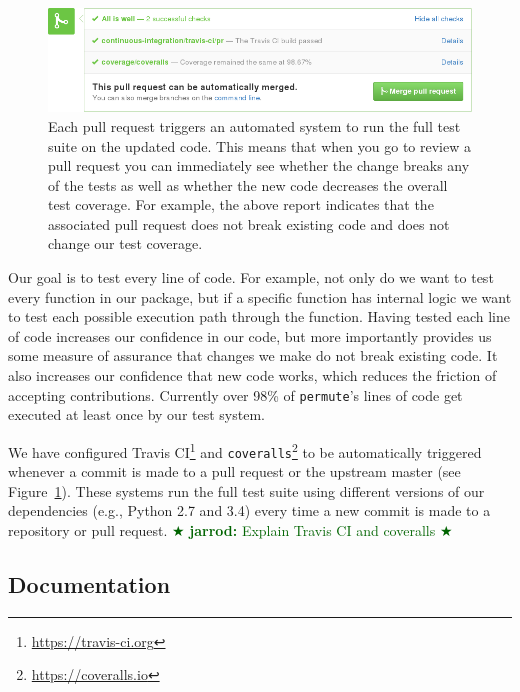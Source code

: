 \documentclass[]{article}
\newcommand{\jarrod}[1] { \textcolor{darkgreen} {
\ensuremath{\bigstar} {\bf jarrod:}  {#1}
\ensuremath{\bigstar} } }
\begin{document}
\begin{figure}
  \begin{centering}
    \includegraphics[width=\textwidth]{_fig/pull-request-ci.png}\par
  \end{centering}

  \caption{\label{fig:pull-request}
  \small
    Each pull request triggers an automated system to run the full test suite on
    the updated code.
    This means that when you go to review a pull request you can immediately see
    whether the change breaks any of the tests as well as whether the new
    code decreases the overall test coverage.
    For example, the above report indicates that the associated pull request does not
    break existing code and does not change our test coverage.}
\end{figure}

Our goal is to test every line of code.
For example, not only do we want to test every function in our package, but if
a specific function has internal logic we want to test each possible execution
path through the function.
Having tested each line of code increases our confidence in our code, but
more importantly provides us some measure of assurance that changes we make do
not break existing code.
It also increases our confidence that new code works, which reduces the
friction of accepting contributions.
Currently over 98\% of \texttt{permute}'s lines of code get executed at least
once by our test system.

We have configured Travis CI\footnote{
  \url{https://travis-ci.org}
} 
and
\texttt{coveralls}\footnote{
  \url{https://coveralls.io}
}
to be automatically
triggered whenever a commit is made to a pull request or the upstream master
(see Figure~\ref{fig:pull-request}).
These systems run the full test suite using different versions of our
dependencies (e.g., Python 2.7 and 3.4) every time a new commit is made to a
repository or pull request.
\jarrod{Explain Travis CI and coveralls}

\subsection{\label{sec:doc}Documentation}
\end{document}
